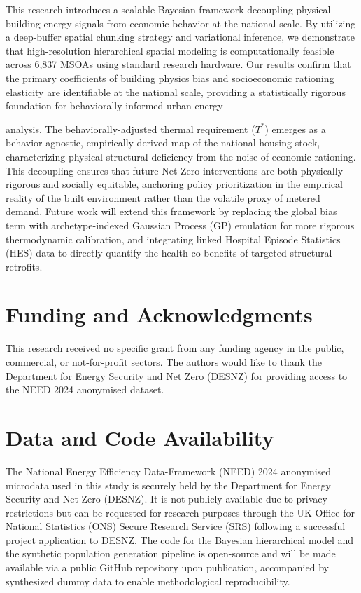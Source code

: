 \documentclass[11pt, a4paper, twocolumn]{article}
\begin{document}
This research introduces a scalable Bayesian framework decoupling 
physical building energy signals from economic behavior at the national 
scale. By utilizing a deep-buffer spatial chunking strategy and 
variational inference, we demonstrate that high-resolution hierarchical 
spatial modeling is computationally feasible across 6,837 MSOAs using 
standard research hardware. Our results confirm that the primary 
coefficients of building physics bias and socioeconomic rationing 
elasticity are identifiable at the national scale, providing a 
statistically rigorous foundation for behaviorally-informed urban energy 

analysis. The behaviorally-adjusted thermal requirement (\(T^*\)) emerges as a 
behavior-agnostic, empirically-derived map of the national housing stock, 
characterizing physical structural deficiency from the noise of economic 
rationing. This decoupling ensures that future Net Zero interventions 
are both physically rigorous and socially equitable, anchoring policy 
prioritization in the empirical reality of the built environment rather 
than the volatile proxy of metered demand.
 Future work will extend this 
framework by replacing the global bias term with archetype-indexed 
Gaussian Process (GP) emulation for more rigorous thermodynamic 
calibration, and integrating linked Hospital Episode Statistics (HES) 
data to directly quantify the health co-benefits of targeted structural 
retrofits.

\section*{Funding and Acknowledgments}\label{funding-and-acknowledgments}

This research received no specific grant from any funding agency in the public, commercial, or not-for-profit sectors. The authors would like to thank the Department for Energy Security and Net Zero (DESNZ) for providing access to the NEED 2024 anonymised dataset.

\section{Data and Code Availability}\label{data-and-code-availability}

The National Energy Efficiency Data-Framework (NEED) 2024 anonymised
microdata used in this study is securely held by the Department for
Energy Security and Net Zero (DESNZ). It is not publicly available due
to privacy restrictions but can be requested for research purposes
through the UK Office for National Statistics (ONS) Secure Research
Service (SRS) following a successful project application to DESNZ. The
code for the Bayesian hierarchical model and the synthetic population
generation pipeline is open-source and will be made available via a
public GitHub repository upon publication, accompanied by synthesized
dummy data to enable methodological reproducibility.



\end{document}
